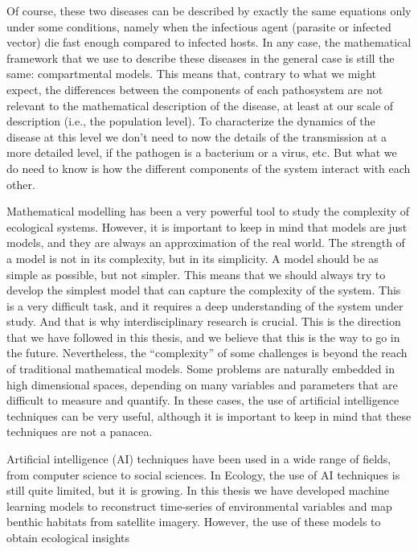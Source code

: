 Of course, these two diseases can be described by exactly the same equations
only under some conditions, namely when the infectious agent (parasite or
infected vector) die fast enough compared to infected hosts. In any case, the
mathematical framework that we use to describe these diseases in the general
case is still the same: compartmental models. This means that, contrary to what
we might expect, the differences between the components of each pathosystem are
not relevant to the mathematical description of the disease, at least at our
scale of description (i.e., the population level). To characterize the dynamics
of the disease at this level we don't need to now the details of the
transmission at a more detailed level, if the pathogen is a bacterium or a
virus, etc. But what we do need to know is how the different components of the
system interact with each other.

Mathematical modelling has been a very powerful tool to study the complexity of
ecological systems. However, it is important to keep in mind that models are
just models, and they are always an approximation of the real world. The
strength of a model is not in its complexity, but in its simplicity. A model
should be as simple as possible, but not simpler. This means that we should
always try to develop the simplest model that can capture the complexity of the
system. This is a very difficult task, and it requires a deep understanding of
the system under study. And that is why interdisciplinary research is
crucial. This is the direction that we have followed in this thesis, and we
believe that this is the way to go in the future. Nevertheless, the
``complexity'' of some challenges is beyond the reach of traditional
mathematical models. Some problems are naturally embedded in high dimensional
spaces, depending on many variables and parameters that are
difficult to measure and quantify. In these cases, the use of artificial
intelligence techniques can be very useful, although it is important to keep in
mind that these techniques are not a panacea.


Artificial intelligence (AI) techniques have been used in a wide range of
fields, from computer science to social sciences. In Ecology, the use of
AI techniques is still quite limited, but it is growing. In this thesis we have
developed machine learning models to reconstruct time-series of environmental
variables and map benthic habitats from satellite imagery. However, the use of
these models to obtain ecological insights

